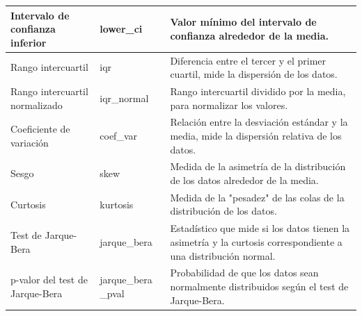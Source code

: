 \begin{longtable}{|m{7em}|m{5em}|m{20em}|}
    Intervalo de confianza inferior & lower\_ci & Valor mínimo del intervalo de confianza alrededor de la media. \\
    \hline
    Rango intercuartil & iqr & Diferencia entre el tercer y el primer cuartil, mide la dispersión de los datos. \\
    \hline
    Rango intercuartil normalizado & iqr\_normal & Rango intercuartil dividido por la media, para normalizar los valores. \\
    \hline
    Coeficiente de variación & coef\_var & Relación entre la desviación estándar y la media, mide la dispersión relativa de los datos. \\
    \hline
    Sesgo & skew & Medida de la asimetría de la distribución de los datos alrededor de la media. \\
    \hline
    Curtosis & kurtosis & Medida de la "pesadez" de las colas de la distribución de los datos. \\
    \hline
    Test de Jarque-Bera & jarque\_bera & Estadístico que mide si los datos tienen la asimetría y la curtosis correspondiente a una distribución normal. \\
    \hline
    p-valor del test de Jarque-Bera & jarque\_bera \_pval & Probabilidad de que los datos sean normalmente distribuidos según el test de Jarque-Bera. \\
    \hline

\end{longtable}
